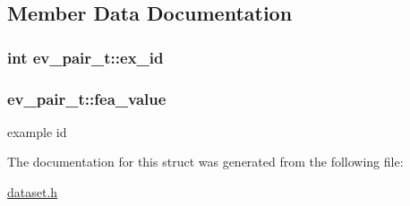 \subsection{Member Data Documentation}
\hypertarget{structev__pair__t_aed493fca94855b5ba8081d4e1a7b28f1}{
\subsubsection[{ex\+\_\+id}]{\setlength{\rightskip}{0pt plus 5cm}int ev\+\_\+pair\+\_\+t\+::ex\+\_\+id}}\label{structev__pair__t_aed493fca94855b5ba8081d4e1a7b28f1}
\hypertarget{structev__pair__t_ab029b4bacf7dc6db2fee53091f5f8063}{
\subsubsection[{fea\+\_\+value}]{ ev\+\_\+pair\+\_\+t\+::fea\+\_\+value}}\label{structev__pair__t_ab029b4bacf7dc6db2fee53091f5f8063}
example id 

The documentation for this struct was generated from the following file\+:\begin{DoxyCompactItemize}
\item 
\hyperlink{dataset_8h}{dataset.\+h}\end{DoxyCompactItemize}
